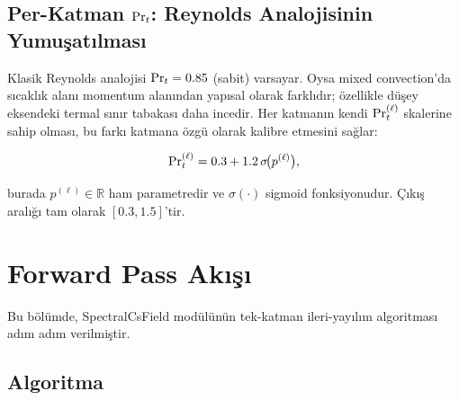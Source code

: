 \subsection{Per-Katman $\mathrm{Pr}_t$: Reynolds Analojisinin Yumuşatılması}

Klasik Reynolds analojisi $\mathrm{Pr}_t = 0.85$ (sabit) varsayar. Oysa
mixed convection'da sıcaklık alanı momentum alanından yapısal olarak
farklıdır; özellikle düşey eksendeki termal sınır tabakası daha incedir.
Her katmanın kendi $\mathrm{Pr}_t^{(\ell)}$ skalerine sahip olması, bu farkı
katmana özgü olarak kalibre etmesini sağlar:

\begin{equation}
  \mathrm{Pr}_t^{(\ell)} = 0.3 + 1.2\,\sigma\!\bigl(p^{(\ell)}\bigr),
  \label{eq:prt-sigmoid}
\end{equation}

\noindent burada $p^{(\ell)}\in\mathbb{R}$ ham parametredir ve $\sigma(\cdot)$
sigmoid fonksiyonudur. Çıkış aralığı tam olarak $[0.3, 1.5]$'tir.

\section{Forward Pass Akışı}
\label{sec:forward-pass}

Bu bölümde, SpectralCsField modülünün tek-katman ileri-yayılım
algoritması adım adım verilmiştir.

\subsection{Algoritma}

